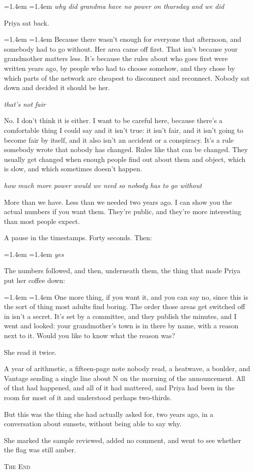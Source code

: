 \documentclass[11pt]{article}
\newenvironment{transcript}
  {\par\vspace{0.6\baselineskip}%
   \begingroup
   \leftskip=1.4em \rightskip=1.4em
   \parindent=0pt \parskip=0.45\baselineskip
   \small}
  {\par\endgroup\vspace{0.6\baselineskip}\noindent}
\newcommand{\user}[1]{{\itshape #1}\par}
\newcommand{\reply}[1]{{\aivoicefont\small #1}\par}
\begin{document}
\begin{transcript}
\user{why did grandma have no power on thursday and we did}
\end{transcript}

\noindent Priya sat back.

\begin{transcript}
\reply{Because there wasn't enough for everyone that afternoon, and somebody had to go without. Her area came off first. That isn't because your grandmother matters less. It's because the rules about who goes first were written years ago, by people who had to choose somehow, and they chose by which parts of the network are cheapest to disconnect and reconnect. Nobody sat down and decided it should be her.}
\user{that's not fair}
\reply{No. I don't think it is either. I want to be careful here, because there's a comfortable thing I could say and it isn't true: it isn't fair, and it isn't going to become fair by itself, and it also isn't an accident or a conspiracy. It's a rule somebody wrote that nobody has changed. Rules like that can be changed. They usually get changed when enough people find out about them and object, which is slow, and which sometimes doesn't happen.}
\user{how much more power would we need so nobody has to go without}
\reply{More than we have. Less than we needed two years ago. I can show you the actual numbers if you want them. They're public, and they're more interesting than most people expect.}
\end{transcript}

\noindent A pause in the timestamps. Forty seconds. Then:

\begin{transcript}
\user{yes}
\end{transcript}

\noindent The numbers followed, and then, underneath them, the thing that made Priya put her coffee down:

\begin{transcript}
\reply{One more thing, if you want it, and you can say no, since this is the sort of thing most adults find boring. The order those areas get switched off in isn't a secret. It's set by a committee, and they publish the minutes, and I went and looked: your grandmother's town is in there by name, with a reason next to it. Would you like to know what the reason was?}
\end{transcript}

\noindent She read it twice.

A year of arithmetic, a fifteen-page note nobody read, a heatwave, a boulder, and Vantage sending a single line about N on the morning of the announcement. All of that had happened, and all of it had mattered, and Priya had been in the room for most of it and understood perhaps two-thirds.

But this was the thing she had actually asked for, two years ago, in a conversation about sunsets, without being able to say why.

She marked the sample reviewed, added no comment, and went to see whether the flag was still amber.

\vspace{2\baselineskip}
{\centering\scshape The End\par}
\end{document}
